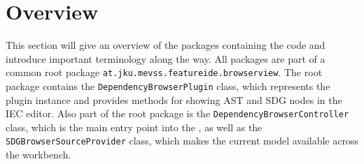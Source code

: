 \section{Overview}

This section will give an overview of the packages containing the \SB code and introduce important terminology along 
the way. All packages are part of a common root package \lstinline|at.jku.mevss.featureide.browserview|. The root 
package contains the \lstinline|DependencyBrowserPlugin| class, which represents the plugin instance and provides 
methods for showing AST and SDG nodes in the IEC editor. Also part of the root package is the 
\lstinline|DependencyBrowserController| class, which is the main entry point into the \SB, as well as the 
\lstinline|SDGBrowserSourceProvider| class, which makes the current model available across the workbench.

